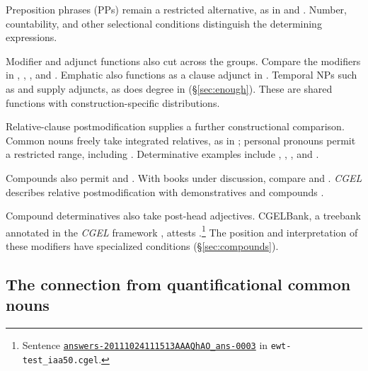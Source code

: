 \documentclass[12pt]{article}
\begin{document}
Preposition phrases (PPs) remain a restricted alternative, as in  and  \citep[356]{huddleston2002}. Number, countability, and other selectional conditions distinguish the determining expressions.

Modifier and adjunct functions also cut across the groups. Compare the modifiers in , , , and . Emphatic  also functions as a clause adjunct in  \citep[1496--1497]{huddleston2002}. Temporal NPs such as  and  supply adjuncts, as does degree  in  (§\ref{sec:enough}). These are shared functions with construction-specific distributions.

Relative-clause postmodification supplies a further constructional comparison. Common nouns freely take integrated relatives, as in ; personal pronouns permit a restricted range, including  \citep[430]{huddleston2002}. Determinative examples include , , , and .

Compounds also permit  and . With books under discussion, compare  and . \textit{CGEL} describes relative postmodification with demonstratives and compounds \citep[414, 422--423]{huddleston2002}.

Compound determinatives also take post-head adjectives. CGELBank, a treebank annotated in the \textit{CGEL} framework \citep{reynolds2023unified}, attests .\footnote{Sentence \href{https://github.com/nert-nlp/cgel/blob/d0a2c2d8c522b23d5aa879fc9cb94948f4285b2c/datasets/ewt-test_iaa50.cgel\#L179-L181}{\nolinkurl{answers-20111024111513AAAQhAO_ans-0003}} in \nolinkurl{ewt-test_iaa50.cgel}.} The position and interpretation of these modifiers have specialized conditions (§\ref{sec:compounds}).

\subsection{The connection from quantificational common nouns}\label{sec:quant-nouns}
\end{document}
